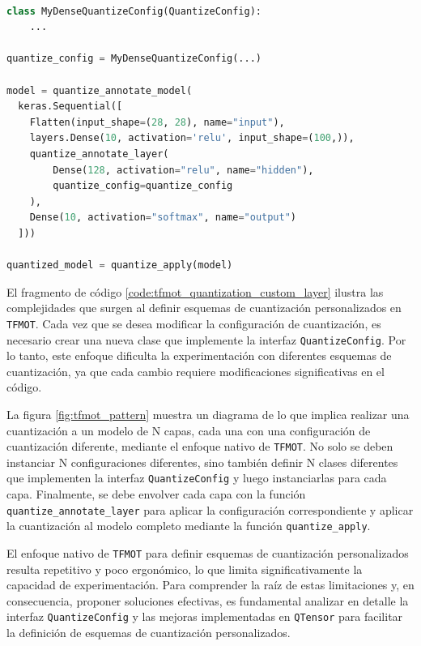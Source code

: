 \newpage
\begin{lstlisting}[language=Python,label=code:tfmot_quantization_custom_layer,caption=Uso de TFMOT para cuantización con configuración personalizada en una capa.]

class MyDenseQuantizeConfig(QuantizeConfig):
    ...

quantize_config = MyDenseQuantizeConfig(...)

model = quantize_annotate_model(
  keras.Sequential([
    Flatten(input_shape=(28, 28), name="input"),
    layers.Dense(10, activation='relu', input_shape=(100,)),
    quantize_annotate_layer(
        Dense(128, activation="relu", name="hidden"),
        quantize_config=quantize_config
    ),
    Dense(10, activation="softmax", name="output")
  ]))

quantized_model = quantize_apply(model)
\end{lstlisting}

El fragmento de código \ref{code:tfmot_quantization_custom_layer} ilustra las complejidades que surgen al definir esquemas de cuantización personalizados en \texttt{TFMOT}. Cada vez que se desea modificar la configuración de cuantización, es necesario crear una nueva clase que implemente la interfaz \texttt{QuantizeConfig}. Por lo tanto, este enfoque dificulta la experimentación con diferentes esquemas de cuantización, ya que cada cambio requiere modificaciones significativas en el código.

La figura \ref{fig:tfmot_pattern} muestra un diagrama de lo que implica realizar una cuantización a un modelo de N capas, cada una con una configuración de cuantización diferente, mediante el enfoque nativo de \texttt{TFMOT}. No solo se deben instanciar N configuraciones diferentes, sino también definir N clases diferentes que implementen la interfaz \texttt{QuantizeConfig} y luego instanciarlas para cada capa. Finalmente, se debe envolver cada capa con la función \texttt{quantize\_annotate\_layer} para aplicar la configuración correspondiente y aplicar la cuantización al modelo completo mediante la función \texttt{quantize\_apply}.


El enfoque nativo de \texttt{TFMOT} para definir esquemas de cuantización personalizados resulta repetitivo y poco ergonómico, lo que limita significativamente la capacidad de experimentación. Para comprender la raíz de estas limitaciones y, en consecuencia, proponer soluciones efectivas, es fundamental analizar en detalle la interfaz \texttt{QuantizeConfig} y las mejoras implementadas en \texttt{QTensor} para facilitar la definición de esquemas de cuantización personalizados.

